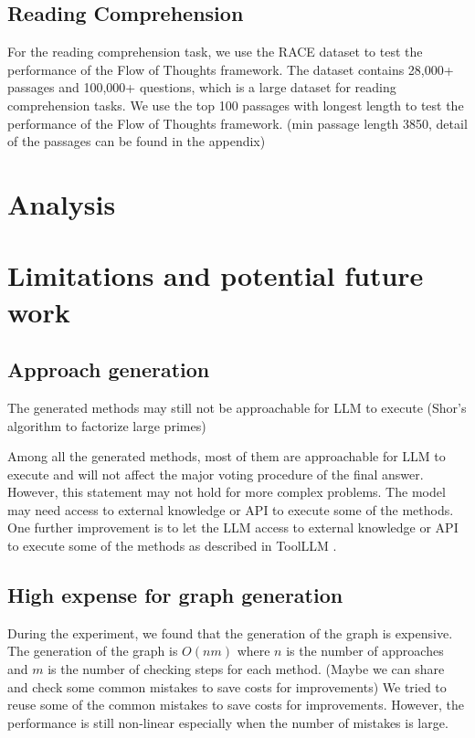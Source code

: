 \documentclass{article}
\begin{document}
\subsection{Reading Comprehension}

For the reading comprehension task, we use the RACE dataset \cite{lai2017large} to test the performance of the Flow of Thoughts framework. The dataset contains 28,000+ passages and 100,000+ questions, which is a large dataset for reading comprehension tasks. We use the top 100 passages with longest length to test the performance of the Flow of Thoughts framework. (min passage length 3850, detail of the passages can be found in the appendix)


\section{Analysis}

\section{Limitations and potential future work}

\subsection{Approach generation}
The generated methods may still not be approachable for LLM to execute (Shor’s algorithm to factorize large primes)

Among all the generated methods, most of them are approachable for LLM to execute and will not affect the major voting procedure of the final answer. However, this statement may not hold for more complex problems. The model may need access to external knowledge or API to execute some of the methods. One further improvement is to let the LLM access to external knowledge or API to execute some of the methods as described in ToolLLM \cite{qin2023toolllmfacilitatinglargelanguage}.

\subsection{High expense for graph generation}

During the experiment, we found that the generation of the graph is expensive. The generation of the graph is $O(nm)$ where $n$ is the number of approaches and $m$ is the number of checking steps for each method. (Maybe we can share and check some common mistakes to save costs for improvements) We tried to reuse some of the common mistakes to save costs for improvements. However, the performance is still non-linear especially when the number of mistakes is large.
\end{document}
